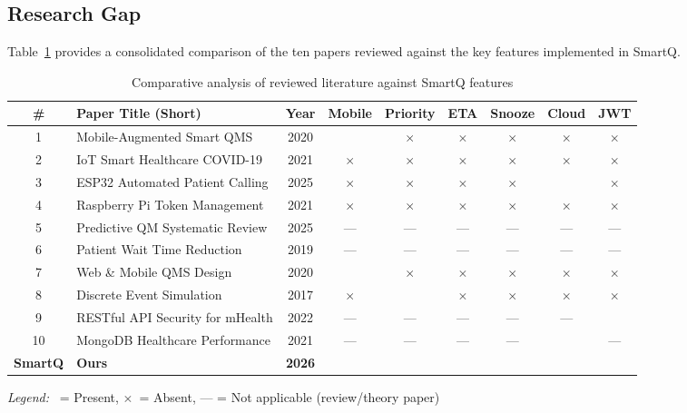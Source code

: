 \documentclass[12pt,a4paper]{article}
\newcommand{\cmark}{\textcolor{green!60!black}{\checkmark}}
\newcommand{\xmark}{\textcolor{red!70!black}{$\times$}}
\newcommand{\dash}{---}
\begin{document}
\subsection{Research Gap}

Table~\ref{tab:lit-summary} provides a consolidated comparison of the ten papers reviewed against the key features implemented in SmartQ.

\begin{table}[H]
\centering
\caption{Comparative analysis of reviewed literature against SmartQ features}
\label{tab:lit-summary}
\small
\begin{tabularx}{\textwidth}{c >{\raggedright\arraybackslash}X c c c c c c c}
\toprule
\textbf{\#} & \textbf{Paper Title (Short)} & \textbf{Year} & \textbf{Mobile} & \textbf{Priority} & \textbf{ETA} & \textbf{Snooze} & \textbf{Cloud} & \textbf{JWT} \\
\midrule
1 & Mobile-Augmented Smart QMS & 2020 & \cmark & \xmark & \xmark & \xmark & \xmark & \xmark \\
2 & IoT Smart Healthcare COVID-19 & 2021 & \xmark & \xmark & \xmark & \xmark & \xmark & \xmark \\
3 & ESP32 Automated Patient Calling & 2025 & \xmark & \xmark & \xmark & \xmark & \cmark & \xmark \\
4 & Raspberry Pi Token Management & 2021 & \xmark & \xmark & \xmark & \xmark & \xmark & \xmark \\
5 & Predictive QM Systematic Review & 2025 & \dash & \dash & \dash & \dash & \dash & \dash \\
6 & Patient Wait Time Reduction & 2019 & \dash & \dash & \dash & \dash & \dash & \dash \\
7 & Web \& Mobile QMS Design & 2020 & \cmark & \xmark & \xmark & \xmark & \xmark & \xmark \\
8 & Discrete Event Simulation & 2017 & \xmark & \cmark & \xmark & \xmark & \xmark & \xmark \\
9 & RESTful API Security for mHealth & 2022 & \dash & \dash & \dash & \dash & \dash & \cmark \\
10 & MongoDB Healthcare Performance & 2021 & \dash & \dash & \dash & \dash & \cmark & \dash \\
\midrule
\textbf{SmartQ} & \textbf{Ours} & \textbf{2026} & \cmark & \cmark & \cmark & \cmark & \cmark & \cmark \\
\bottomrule
\end{tabularx}
\vspace{0.3em}
\noindent\small\textit{Legend:} \cmark\ = Present, \xmark\ = Absent, --- = Not applicable (review/theory paper)
\end{table}
\end{document}
